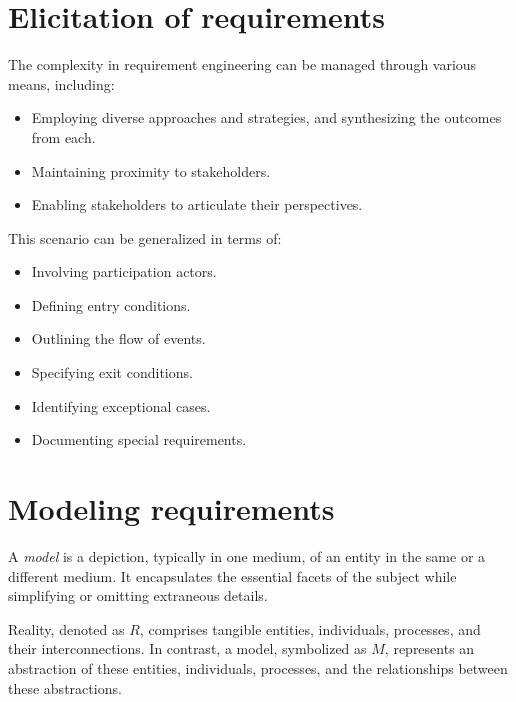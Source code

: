 \documentclass[12pt, a4paper]{report}
\begin{document}
    \section{Elicitation of requirements}
    The complexity in requirement engineering can be managed through various means, including:
    \begin{itemize}
        \item Employing diverse approaches and strategies, and synthesizing the outcomes from each.
        \item Maintaining proximity to stakeholders.
        \item Enabling stakeholders to articulate their perspectives.
    \end{itemize}
    This scenario can be generalized in terms of:
    \begin{itemize}
        \item Involving participation actors.
        \item Defining entry conditions.
        \item Outlining the flow of events.
        \item Specifying exit conditions.
        \item Identifying exceptional cases.
        \item Documenting special requirements.
    \end{itemize}

    \section{Modeling requirements}
    \begin{definition}
        A \emph{model} is a depiction, typically in one medium, of an entity in the same or a different medium.
        It encapsulates the essential facets of the subject while simplifying or omitting extraneous details.
    \end{definition}
    Reality, denoted as $R$, comprises tangible entities, individuals, processes, and their interconnections. 
    In contrast, a model, symbolized as $M$, represents an abstraction of these entities, individuals, processes, and the relationships between these abstractions.
    
\end{document}
